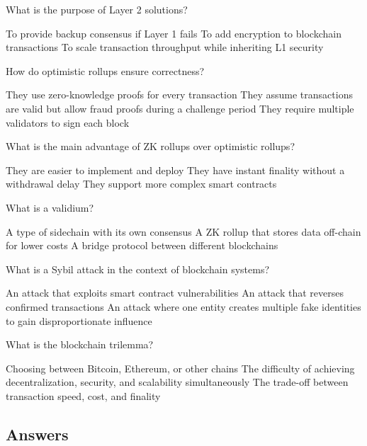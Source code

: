\documentclass[10pt,a4paper,american]{exam}
\begin{document}
\begin{questions}
	\question What is the purpose of Layer 2 solutions?
	\begin{randomizechoices}
		\choice To provide backup consensus if Layer 1 fails
		\choice To add encryption to blockchain transactions
		\CorrectChoice To scale transaction throughput while inheriting L1 security
	\end{randomizechoices}

	\question How do optimistic rollups ensure correctness?
	\begin{randomizechoices}
		\choice They use zero-knowledge proofs for every transaction
		\CorrectChoice They assume transactions are valid but allow fraud proofs during a challenge period
		\choice They require multiple validators to sign each block
	\end{randomizechoices}

	\question What is the main advantage of ZK rollups over optimistic rollups?
	\begin{randomizechoices}
		\choice They are easier to implement and deploy
		\CorrectChoice They have instant finality without a withdrawal delay
		\choice They support more complex smart contracts
	\end{randomizechoices}

	\question What is a validium?
	\begin{randomizechoices}
		\choice A type of sidechain with its own consensus
		\CorrectChoice A ZK rollup that stores data off-chain for lower costs
		\choice A bridge protocol between different blockchains
	\end{randomizechoices}

	\question What is a Sybil attack in the context of blockchain systems?
	\begin{randomizechoices}
		\choice An attack that exploits smart contract vulnerabilities
		\choice An attack that reverses confirmed transactions
		\CorrectChoice An attack where one entity creates multiple fake identities to gain disproportionate influence
	\end{randomizechoices}

	\question What is the blockchain trilemma?
	\begin{randomizechoices}
		\choice Choosing between Bitcoin, Ethereum, or other chains
		\CorrectChoice The difficulty of achieving decentralization, security, and scalability simultaneously
		\choice The trade-off between transaction speed, cost, and finality
	\end{randomizechoices}

\end{questions}

\clearpage

\subsection*{Answers}
\printkeytable
\end{document}
